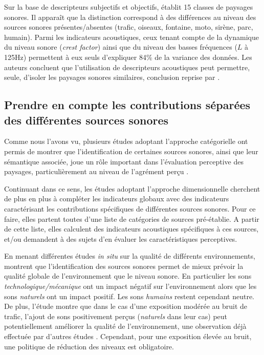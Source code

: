 Sur la base de descripteurs subjectifs et objectifs, \citep{torija2013application} établit 15 classes de paysages sonores. Il apparaît que la distinction correspond à des différences au niveau des sources sonores présentes/absentes (trafic, oiseaux, fontaine, moto, sirène, parc, humain). Parmi les indicateurs acoustiques, ceux tenant compte de la dynamique du niveau sonore (\emph{crest factor}) ainsi que du niveau des basses fréquences ($L$ à 125Hz) permettent à eux seuls d'expliquer 84\% de la variance des données. Les auteurs concluent que l'utilisation de descripteurs acoustiques peut permettre, seule, d'isoler les paysages sonores similaires, conclusion reprise par \citep{rychtarikova2013soundscape}.


\subsection{Prendre en compte les contributions séparées des différentes sources sonores}
\label{sec:ch3_contribSource}

Comme nous l'avons vu, plusieurs études adoptant l'approche catégorielle ont permis de montrer que l'identification de certaines sources sonores, ainsi que leur sémantique associée, joue un rôle important dans l'évaluation perceptive des paysages, particulièrement au niveau de l'agrément perçu \citep{guastavino2006ideal,szeremeta2009analysis}.

Continuant dans ce sens, les études adoptant l'approche dimensionnelle cherchent de plus en plus à compléter les indicateurs globaux avec des indicateurs caractérisant les contributions spécifiques de différentes sources sonores. Pour ce faire, elles partent toutes d'une liste de catégories de sources pré-établie. A partir de cette liste, elles calculent des indicateurs acoustiques spécifiques à ces sources, et/ou demandent à des sujets d'en évaluer les caractéristiques perceptives.

En menant différentes études \emph{in situ} sur la qualité de différents environnements, \citep{nilsson2007acoustic,nilsson2007soundscape} montrent que l'identification des sources sonores permet de mieux prévoir la qualité globale de l'environnement que le niveau sonore. En particulier les sons \emph{technologique/mécanique} ont un impact négatif sur l'environnement alors que les sons \emph{naturels} ont un impact positif. Les sons \emph{humains} restent cependant neutre. De plus, l'étude montre que dans le cas d'une exposition modérée au bruit de trafic, l'ajout de sons positivement perçus (\emph{naturels} dans leur cas) peut potentiellement améliorer la qualité de l'environnement, une observation déjà effectuée par d'autres études \citep{hong2013designing,galbrun2012perceptual}. Cependant, pour une exposition élevée au bruit, une politique de réduction des niveaux est obligatoire.

